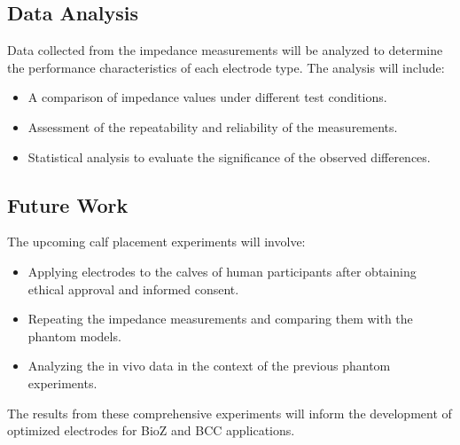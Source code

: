 \subsection{Data Analysis}
Data collected from the impedance measurements will be analyzed to determine the performance characteristics of each electrode type. The analysis will include:
\begin{itemize}
    \item A comparison of impedance values under different test conditions.
    \item Assessment of the repeatability and reliability of the measurements.
    \item Statistical analysis to evaluate the significance of the observed differences.
\end{itemize}

\subsection{Future Work}
The upcoming calf placement experiments will involve:
\begin{itemize}
    \item Applying electrodes to the calves of human participants after obtaining ethical approval and informed consent.
    \item Repeating the impedance measurements and comparing them with the phantom models.
    \item Analyzing the in vivo data in the context of the previous phantom experiments.
\end{itemize}

The results from these comprehensive experiments will inform the development of optimized electrodes for BioZ and BCC applications.


